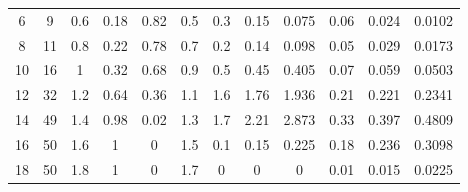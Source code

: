 \begin{table}[htbp]
{\begin{tabular}{cccccccccccc}
            6                                   & 9              & 0.6               & 0.18              & 0.82                & 0.5                       & 0.3          & 0.15                     & 0.075                      & 0.06                         & 0.024                               & 0.0102                                \\
            8                                   & 11             & 0.8               & 0.22              & 0.78                & 0.7                       & 0.2          & 0.14                     & 0.098                      & 0.05                         & 0.029                               & 0.0173                                \\
            \rowcolor{blue!20} 10               & 16             & 1                 & 0.32              & 0.68                & 0.9                       & 0.5          & 0.45                     & 0.405                      & 0.07                         & 0.059                               & 0.0503                                \\
            \rowcolor{red!20} 12                & 32             & 1.2               & 0.64              & 0.36                & 1.1                       & 1.6          & 1.76                     & 1.936                      & 0.21                         & 0.221                               & 0.2341                                \\
            14                                  & 49             & 1.4               & 0.98              & 0.02                & 1.3                       & 1.7          & 2.21                     & 2.873                      & 0.33                         & 0.397                               & 0.4809                                \\
            16                                  & 50             & 1.6               & 1                 & 0                   & 1.5                       & 0.1          & 0.15                     & 0.225                      & 0.18                         & 0.236                               & 0.3098                                \\
            18                                  & 50             & 1.8               & 1                 & 0                   & 1.7                       & 0            & 0                        & 0                          & 0.01                         & 0.015                               & 0.0225                                \\

\end{tabular}}
\end{table}
